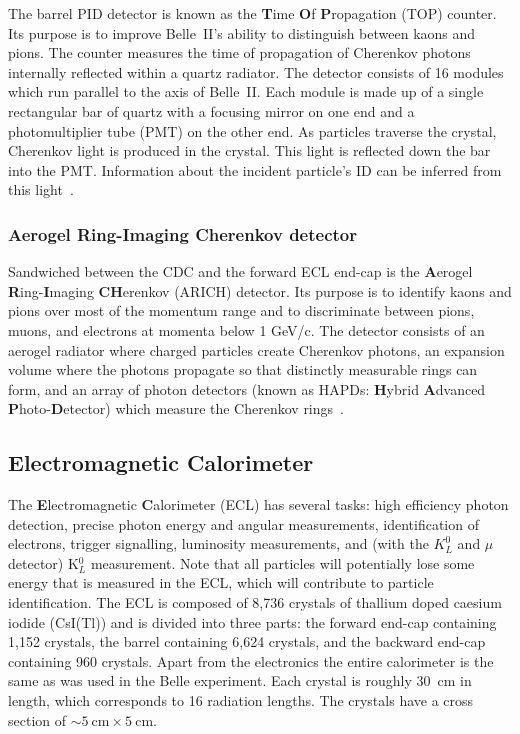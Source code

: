 	The barrel PID detector is known as the \textbf{T}ime \textbf{O}f \textbf{P}ropagation (TOP) counter. Its purpose is to improve Belle~II's ability to distinguish between kaons and pions. The counter measures the time of propagation of Cherenkov photons internally reflected within a quartz radiator. The detector consists of 16 modules which run parallel to the axis of Belle~II. Each module is made up of a single rectangular bar of quartz with a focusing mirror on one end and a photomultiplier tube (PMT) on the other end. As particles traverse the crystal, Cherenkov light is produced in the crystal. This light is reflected down the bar into the PMT. Information about the incident particle's ID can be inferred from this light~\cite{BELLE2TDR}.


\subsubsection{Aerogel Ring-Imaging Cherenkov detector}
\label{sec:ARICH}

	Sandwiched between the CDC and the forward ECL end-cap is the \textbf{A}erogel \textbf{R}ing-\textbf{I}maging \textbf{CH}erenkov (ARICH) detector. Its purpose is to identify kaons and pions over most of the momentum range and to discriminate between pions, muons, and electrons at momenta below 1 GeV/c. The detector consists of an aerogel radiator where charged particles create Cherenkov photons, an expansion volume where the photons propagate so that distinctly measurable rings can form, and an array of photon detectors (known as HAPDs: \textbf{H}ybrid \textbf{A}dvanced \textbf{P}hoto-\textbf{D}etector) which measure the Cherenkov rings~\cite{BELLE2TDR}.



\subsection{Electromagnetic Calorimeter}
\label{sec:ECL}

	The \textbf{E}lectromagnetic \textbf{C}alorimeter (ECL) has several tasks: high efficiency photon detection, precise photon energy and angular measurements, identification of electrons, trigger signalling, luminosity measurements, and (with the $K_{L}^0$ and $\mu$ detector) K$_L^0$ measurement. Note that all particles will potentially lose some energy that is measured in the ECL, which will contribute to particle identification. The ECL is composed of 8,736 crystals of thallium doped caesium iodide (CsI(Tl)) and is divided into three parts: the forward end-cap containing 1,152 crystals, the barrel containing 6,624 crystals, and the backward end-cap containing 960 crystals. Apart from the electronics the entire calorimeter is the same as was used in the Belle experiment. Each crystal is roughly 30~cm in length, which corresponds to 16 radiation lengths. The crystals have a cross section of $\sim5~\mathrm{cm}\times5~\mathrm{cm}$.

